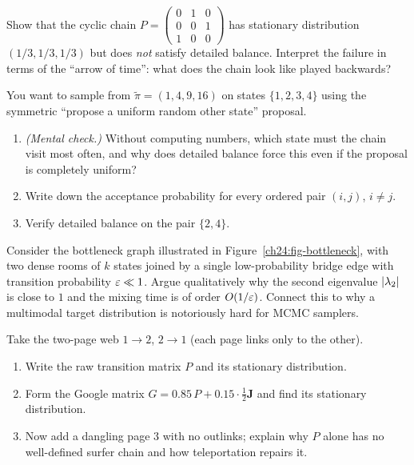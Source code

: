 \begin{exercise}
\label{ch24:ex-detailed-balance-fails}
Show that the cyclic chain
$P=\left(\begin{smallmatrix}0&1&0\\0&0&1\\1&0&0\end{smallmatrix}\right)$ has
stationary distribution $(1/3,1/3,1/3)$ but does \emph{not} satisfy detailed
balance. Interpret the failure in terms of the ``arrow of time'': what does the
chain look like played backwards?
\end{exercise}

\begin{exercise}
\label{ch24:ex-metropolis-by-hand}
You want to sample from $\tilde\pi = (1, 4, 9, 16)$ on states $\{1,2,3,4\}$ using
the symmetric ``propose a uniform random other state'' proposal.
\begin{enumerate}[label=(\alph*)]
  \item \emph{(Mental check.)} Without computing numbers, which state must the
    chain visit most often, and why does detailed balance force this even if the
    proposal is completely uniform?
  \item Write down the acceptance probability for every ordered pair $(i,j)$, $i\neq j$.
  \item Verify detailed balance on the pair $\{2,4\}$.
\end{enumerate}
\end{exercise}

\begin{exercise}
\label{ch24:ex-bottlenecks}
Consider the bottleneck graph illustrated in Figure~\ref{ch24:fig-bottleneck},
with two dense rooms of $k$ states joined by a single low-probability bridge edge
with transition probability $\varepsilon \ll 1$. Argue qualitatively why the second
eigenvalue $\lvert\lambda_2\rvert$ is close to $1$ and the mixing time is of order $O(1/\varepsilon)$.
Connect this to why a multimodal target distribution is notoriously hard for MCMC samplers.
\end{exercise}

\begin{exercise}
\label{ch24:ex-pagerank-teleport}
Take the two-page web $1 \to 2$, $2 \to 1$ (each page links only to the other).
\begin{enumerate}[label=(\alph*)]
  \item Write the raw transition matrix $P$ and its stationary distribution.
  \item Form the Google matrix $G = 0.85\,P + 0.15\cdot\tfrac12 \mathbf{J}$ and find
    its stationary distribution.
  \item Now add a dangling page $3$ with no outlinks; explain why $P$ alone has no
    well-defined surfer chain and how teleportation repairs it.
\end{enumerate}
\end{exercise}

